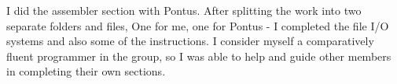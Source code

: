 I did the assembler section with Pontus. After splitting the work into two separate folders and files, One for me, one for Pontus - I completed the file I/O systems and also some of the instructions. I consider myself a comparatively fluent programmer in the group, so I was able to help and guide other members in completing their own sections. 